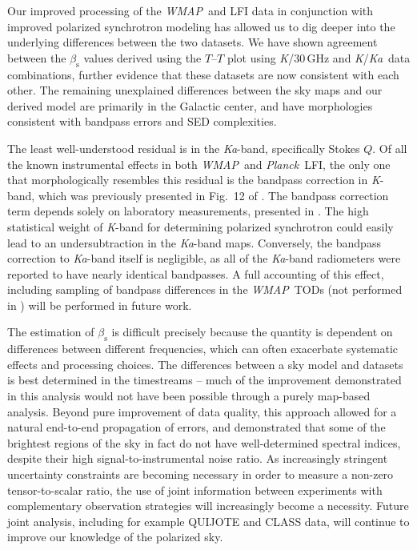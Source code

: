 \documentclass[twocolumn]{../../common/aa}
\def\WMAP{\emph{WMAP}}
\def\Planck{\emph{Planck}}
\newcommand{\K}[0]{\textit K}
\newcommand{\Ka}[0]{\textit{Ka}}
\begin{document}
Our improved processing of the \WMAP\ and LFI data in conjunction with improved polarized synchrotron modeling has allowed us to dig deeper into the underlying differences between the two datasets. We have shown agreement between the $\beta_\mathrm s$ values derived using the $T$--$T$ plot using \K/30\,GHz and \K/\Ka\ data combinations, further evidence that these datasets are now consistent with each other. The remaining unexplained differences between the sky maps and our derived model are primarily in the Galactic center, and have morphologies consistent with bandpass errors and SED complexities.


The least well-understood residual is in the \Ka-band, specifically Stokes $Q$. Of all the known instrumental effects in both \WMAP\ and \Planck\ LFI, the only one that morphologically resembles this residual is the bandpass correction in \K-band, which was previously presented in Fig.~12 of \citet{watts2023_dr1}. The bandpass correction term depends solely on laboratory measurements, presented in \citet{jarosik2003:MAP}. The high statistical weight of \K-band for determining polarized synchrotron could easily lead to an undersubtraction in the \Ka-band maps. Conversely, the bandpass correction to \Ka-band itself is negligible, as all of the \Ka-band radiometers were reported to have nearly identical bandpasses. A full accounting of this effect, including sampling of bandpass differences in the \WMAP\ TODs (not performed in \citealt{watts2023_dr1}) will be performed in future work.


The estimation of $\beta_\mathrm s$ is difficult precisely because the quantity is dependent on differences between different frequencies, which can often exacerbate systematic effects and processing choices. The differences between a sky model and datasets is best determined in the timestreams -- much of the improvement demonstrated in this analysis would not have been possible through a purely map-based analysis. Beyond pure improvement of data quality, this approach allowed for a natural end-to-end propagation of errors, and demonstrated that some of the brightest regions of the sky in fact do not have well-determined spectral indices, despite their high signal-to-instrumental noise ratio. As increasingly stringent uncertainty constraints are becoming necessary in order to measure a non-zero tensor-to-scalar ratio, the use of joint information between experiments with complementary observation strategies will increasingly become a necessity. Future joint analysis, including for example QUIJOTE and CLASS data, will continue to improve our knowledge of the polarized sky.
\end{document}
